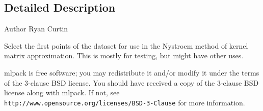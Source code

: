\subsection{Detailed Description}
\begin{DoxyAuthor}{Author}
Ryan Curtin
\end{DoxyAuthor}
Select the first points of the dataset for use in the Nystroem method of kernel matrix approximation. This is mostly for testing, but might have other uses.

mlpack is free software; you may redistribute it and/or modify it under the terms of the 3-\/clause B\+SD license. You should have received a copy of the 3-\/clause B\+SD license along with mlpack. If not, see {\tt http\+://www.\+opensource.\+org/licenses/\+B\+S\+D-\/3-\/\+Clause} for more information. 